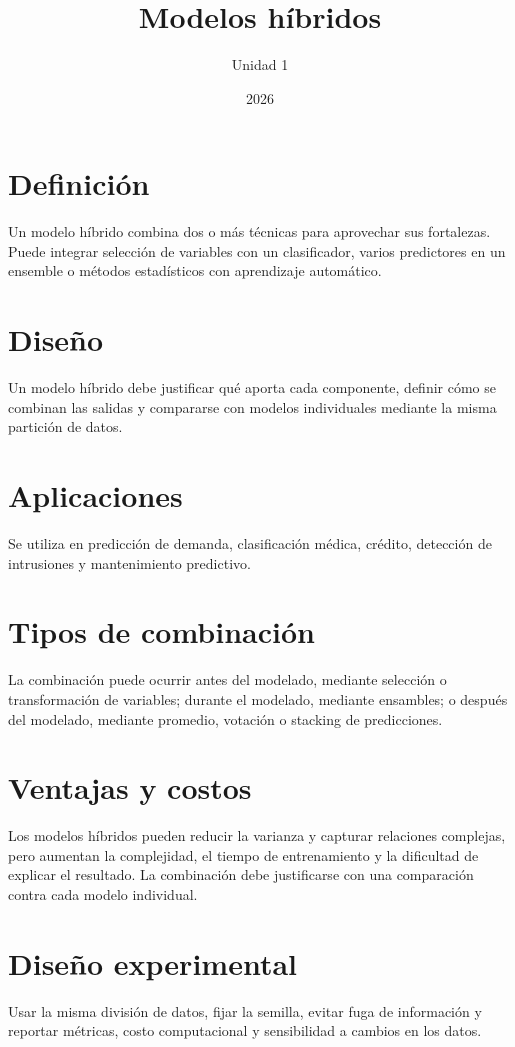 \documentclass[12pt,a4paper]{article}
\title{Modelos híbridos}
\author{Unidad 1}
\date{2026}
\begin{document}
\maketitle
\section{Definición}
Un modelo híbrido combina dos o más técnicas para aprovechar sus fortalezas. Puede integrar selección de variables con un clasificador, varios predictores en un ensemble o métodos estadísticos con aprendizaje automático.
\section{Diseño}
Un modelo híbrido debe justificar qué aporta cada componente, definir cómo se combinan las salidas y compararse con modelos individuales mediante la misma partición de datos.
\section{Aplicaciones}
Se utiliza en predicción de demanda, clasificación médica, crédito, detección de intrusiones y mantenimiento predictivo.
\section{Tipos de combinación}
La combinación puede ocurrir antes del modelado, mediante selección o transformación de variables; durante el modelado, mediante ensambles; o después del modelado, mediante promedio, votación o stacking de predicciones.
\section{Ventajas y costos}
Los modelos híbridos pueden reducir la varianza y capturar relaciones complejas, pero aumentan la complejidad, el tiempo de entrenamiento y la dificultad de explicar el resultado. La combinación debe justificarse con una comparación contra cada modelo individual.
\section{Diseño experimental}
Usar la misma división de datos, fijar la semilla, evitar fuga de información y reportar métricas, costo computacional y sensibilidad a cambios en los datos.
\end{document}
